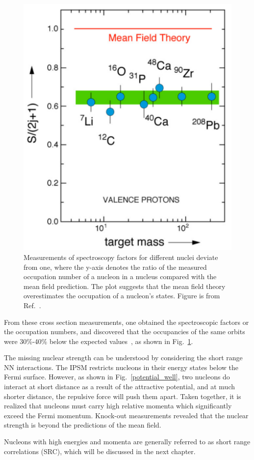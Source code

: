 \begin{figure}[!ht]
  \begin{center}
    \includegraphics[type=pdf,ext=.pdf,read=.pdf,width=0.45\linewidth]{./figures/physics/spec_fac_exp}
    \caption[Measurements of spectroscopy factors]{\footnotesize{Measurements of spectroscopy factors for different nuclei deviate from one, where the y-axis denotes the ratio of the measured occupation number of a nucleon in a nucleus compared with the mean field prediction. The plot suggests that the mean field theory overestimates the occupation of a nucleon's states. Figure is from Ref.~\cite{Lapikas1993297}.}}
    \label{spec_fac_exp}
  \end{center}
\end{figure} 
 From these cross section measurements, one obtained the spectroscopic factors or the occupation numbers, and discovered that the occupancies of the same orbits were 30\%-40\% below the expected values~\cite{Lapikas1993297,Kelly:1996hd}, as shown in Fig.~\ref{spec_fac_exp}. 
 
 The missing nuclear strength can be understood by considering the short range NN interactions. The IPSM restricts nucleons in their energy states below the Fermi surface. However, as shown in Fig.~\ref{potential_well}, two nucleons do interact at short distance as a result of the attractive potential, and at much shorter distance, the repulsive force will push them apart. Taken together, it is realized that nucleons must carry high relative momenta which significantly exceed the Fermi momentum. Knock-out measurements revealed that the nuclear strength is beyond the predictions of the mean field. 
 
 Nucleons with high energies and momenta are generally referred to as short range correlations (SRC), which will be discussed in the next chapter.
